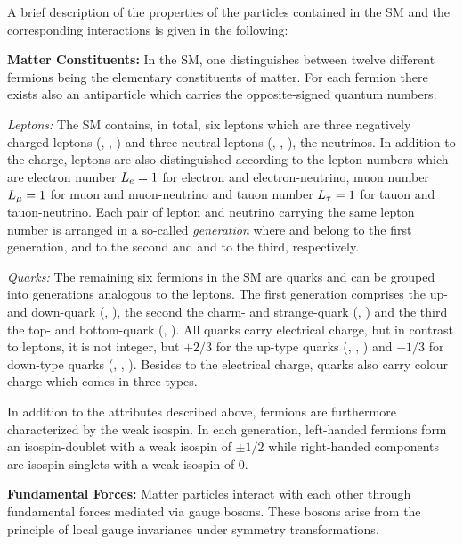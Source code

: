 A brief description of the properties of the particles contained in the SM and the corresponding interactions is given in the following:
\begin{description}

\item \textbf{Matter Constituents:}
In the SM, one distinguishes between twelve different fermions being the elementary constituents of matter. For each fermion there exists also an antiparticle which carries the opposite-signed quantum numbers.
 \begin{description}
  \item \textit{Leptons:} The SM contains, in total, six leptons which are three negatively charged leptons (\lel, \lmu, \ltau) and three neutral leptons (\nue, \numu, \nutau), the neutrinos. In addition to the charge, leptons are also distinguished according to the lepton numbers which are electron number $L_{e} = 1$ for electron and electron-neutrino, muon number $L_{\mu} = 1$ for muon and muon-neutrino and tauon number $L_{\tau} = 1$ for tauon and tauon-neutrino. Each pair of lepton and neutrino carrying the same lepton number is arranged in a so-called \textit{generation} where \lel and \nue belong to the first generation, \lmu and \numu to the second and \ltau and \nutau to the third, respectively.
  \item \textit{Quarks:} The remaining six fermions in the SM are quarks and can be grouped into generations analogous to the leptons. The first generation comprises the up- and down-quark (\qu, \qd), the second the charm- and strange-quark (\qc, \qs) and the third the top- and bottom-quark (\qt, \qb). All quarks carry electrical charge, but in contrast to leptons, it is not integer, but $+2/3$ for the up-type quarks (\qu, \qc, \qt) and $-1/3$ for down-type quarks (\qd, \qs, \qb). Besides to the electrical charge, quarks also carry colour charge which comes in three types.
 \end{description}
In addition to the attributes described above, fermions are furthermore characterized by the weak isospin. In each generation, left-handed fermions form an isospin-doublet with a weak isospin of $\pm 1/2$ while right-handed components are isospin-singlets with a weak isospin of 0. 
\item \textbf{Fundamental Forces:}
Matter particles interact with each other through fundamental forces mediated via gauge bosons. These bosons arise from the principle of local gauge invariance under symmetry transformations. 
 \begin{description}

\end{description}
\end{description}
